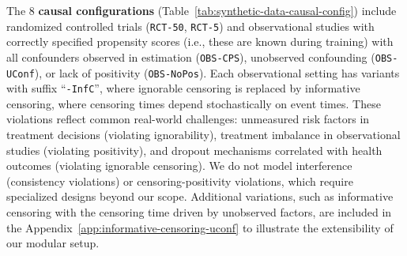 \documentclass{article} %
\begin{document}
The 8 \textbf{causal configurations} (Table~\ref{tab:synthetic-data-causal-config}) include randomized controlled trials (\texttt{RCT-50}, \texttt{RCT-5}) and observational studies with correctly specified propensity scores (i.e., these are known during training) with all confounders observed in estimation (\texttt{OBS-CPS}), unobserved confounding (\texttt{OBS-UConf}), or lack of positivity (\texttt{OBS-NoPos}). Each observational setting has variants with suffix ``\texttt{-InfC}'', where ignorable censoring is replaced by informative censoring, where censoring times depend stochastically on event times. These violations reflect common real-world challenges: unmeasured risk factors in treatment decisions (violating ignorability), treatment imbalance in observational studies (violating positivity), and dropout mechanisms correlated with health outcomes (violating ignorable censoring). We do not model interference (consistency violations) or censoring-positivity violations, which require specialized designs beyond our scope. 
Additional variations, such as informative censoring with the censoring time driven by unobserved factors, are included in the Appendix~\ref{app:informative-censoring-uconf} to illustrate the extensibility of our modular setup.
\end{document}
